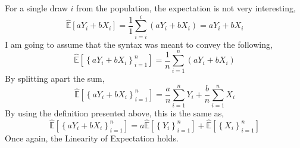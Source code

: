 \documentclass[12pt,twoside]{article}
\begin{document}
\begin{problems}
\begin{problemparts}
\problempart %

For a single draw $i$ from the population, the expectation is not very interesting,
$$ \hat{\mathbb{E}}[a Y_i + b X_i] = \frac{1}{1} \sum_{i = i}^i \left(a Y_i + b 
X_i\right) = a Y_i + b X_i $$
I am going to assume that the syntax was meant to convey the following,
$$ \hat{\mathbb{E}}\left[\left\{a Y_i + b X_i \right\}_{i = 1}^n \right] = \frac{1}
{n} \sum_{i = 1}^n \left(a Y_i + b X_i\right) $$
By splitting apart the sum,
$$ \hat{\mathbb{E}}\left[\left\{a Y_i + b X_i \right\}_{i = 1}^n \right] =
\frac{a}{n} \sum_{i = 1}^n Y_i + \frac{b}{n} \sum_{i = 1}^n X_i $$
By using the definition presented above, this is the same as,
$$ \hat{\mathbb{E}}\left[\left\{a Y_i + b X_i \right\}_{i = 1}^n \right] = a
\hat{\mathbb{E}}\left[\left\{Y_i\right\}_{i = 1}^n \right] +
\hat{\mathbb{E}}\left[\left\{X_i\right\}_{i = 1}^n \right] $$
Once again, the Linearity of Expectation holds.

\problempart %


\end{problemparts}
\end{problems}
\end{document}
